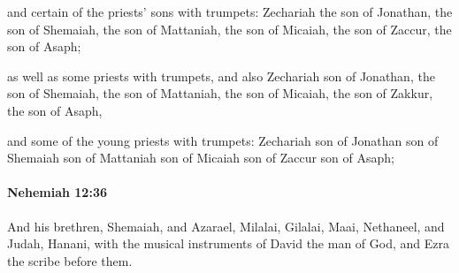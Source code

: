 			\begin{versebox}
					\item[BHS] 
					\item[LXX] 
					\item[ASV] and certain of the priests' sons with trumpets: Zechariah the son of Jonathan, the son of Shemaiah, the son of Mattaniah, the son of Micaiah, the son of Zaccur, the son of Asaph;
					\item[NIV] as well as some priests with trumpets, and also Zechariah son of Jonathan, the son of Shemaiah, the son of Mattaniah, the son of Micaiah, the son of Zakkur, the son of Asaph,
					\item[NRSV] and some of the young priests with trumpets: Zechariah son of Jonathan son of Shemaiah son of Mattaniah son of Micaiah son of Zaccur son of Asaph;
			\end{versebox}

		\paragraph{Nehemiah 12:36} %
			\label{NEHEMIAH-12-36}

			And his brethren, Shemaiah, and Azarael, Milalai, Gilalai, Maai, Nethaneel, and Judah, Hanani, with the musical instruments of David the man of God, and Ezra the scribe before them.

